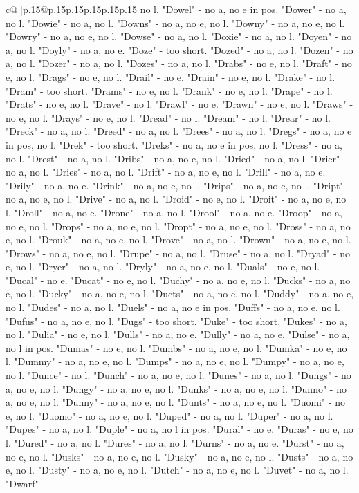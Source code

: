\documentclass{article}
\begin{document}
{\begin{supertabular}{c@{$\;$}|p{.15\linewidth}@{}p{.15\linewidth}p{.15\linewidth}p{.15\linewidth}p{.15\linewidth}p{.15\linewidth}}
{{{no l. "Dowel" {-} no a, no e in pos. "Dower" {-} no a, no l. "Dowie" {-} no a, no l. "Downs" {-} no a, no e, no l. "Downy" {-} no a, no e, no l. "Dowry" {-} no a, no e, no l. "Dowse" {-} no a, no l. "Doxie" {-} no a, no l. "Doyen" {-} no a, no l. "Doyly" {-} no a, no e. "Doze" {-} too short. "Dozed" {-} no a, no l. "Dozen" {-} no a, no l. "Dozer" {-} no a, no l. "Dozes" {-} no a, no l. "Drabs" {-} no e, no l. "Draft" {-} no e, no l. "Drags" {-} no e, no l. "Drail" {-} no e. "Drain" {-} no e, no l. "Drake" {-} no l. "Dram" {-} too short. "Drams" {-} no e, no l. "Drank" {-} no e, no l. "Drape" {-} no l. "Drats" {-} no e, no l. "Drave" {-} no l. "Drawl" {-} no e. "Drawn" {-} no e, no l. "Draws" {-} no e, no l. "Drays" {-} no e, no l. "Dread" {-} no l. "Dream" {-} no l. "Drear" {-} no l. "Dreck" {-} no a, no l. "Dreed" {-} no a, no l. "Drees" {-} no a, no l. "Dregs" {-} no a, no e in pos, no l. "Drek" {-} too short. "Dreks" {-} no a, no e in pos, no l. "Dress" {-} no a, no l. "Drest" {-} no a, no l. "Dribs" {-} no a, no e, no l. "Dried" {-} no a, no l. "Drier" {-} no a, no l. "Dries" {-} no a, no l. "Drift" {-} no a, no e, no l. "Drill" {-} no a, no e. "Drily" {-} no a, no e. "Drink" {-} no a, no e, no l. "Drips" {-} no a, no e, no l. "Dript" {-} no a, no e, no l. "Drive" {-} no a, no l. "Droid" {-} no e, no l. "Droit" {-} no a, no e, no l. "Droll" {-} no a, no e. "Drone" {-} no a, no l. "Drool" {-} no a, no e. "Droop" {-} no a, no e, no l. "Drops" {-} no a, no e, no l. "Dropt" {-} no a, no e, no l. "Dross" {-} no a, no e, no l. "Drouk" {-} no a, no e, no l. "Drove" {-} no a, no l. "Drown" {-} no a, no e, no l. "Drows" {-} no a, no e, no l. "Drupe" {-} no a, no l. "Druse" {-} no a, no l. "Dryad" {-} no e, no l. "Dryer" {-} no a, no l. "Dryly" {-} no a, no e, no l. "Duals" {-} no e, no l. "Ducal" {-} no e. "Ducat" {-} no e, no l. "Duchy" {-} no a, no e, no l. "Ducks" {-} no a, no e, no l. "Ducky" {-} no a, no e, no l. "Ducts" {-} no a, no e, no l. "Duddy" {-} no a, no e, no l. "Dudes" {-} no a, no l. "Duels" {-} no a, no e in pos. "Duffs" {-} no a, no e, no l. "Dufus" {-} no a, no e, no l. "Dugs" {-} too short. "Duke" {-} too short. "Dukes" {-} no a, no l. "Dulia" {-} no e, no l. "Dulls" {-} no a, no e. "Dully" {-} no a, no e. "Dulse" {-} no a, no l in pos. "Dumas" {-} no e, no l. "Dumbs" {-} no a, no e, no l. "Dumka" {-} no e, no l. "Dummy" {-} no a, no e, no l. "Dumps" {-} no a, no e, no l. "Dumpy" {-} no a, no e, no l. "Dunce" {-} no l. "Dunch" {-} no a, no e, no l. "Dunes" {-} no a, no l. "Dungs" {-} no a, no e, no l. "Dungy" {-} no a, no e, no l. "Dunks" {-} no a, no e, no l. "Dunno" {-} no a, no e, no l. "Dunny" {-} no a, no e, no l. "Dunts" {-} no a, no e, no l. "Duomi" {-} no e, no l. "Duomo" {-} no a, no e, no l. "Duped" {-} no a, no l. "Duper" {-} no a, no l. "Dupes" {-} no a, no l. "Duple" {-} no a, no l in pos. "Dural" {-} no e. "Duras" {-} no e, no l. "Dured" {-} no a, no l. "Dures" {-} no a, no l. "Durns" {-} no a, no e. "Durst" {-} no a, no e, no l. "Dusks" {-} no a, no e, no l. "Dusky" {-} no a, no e, no l. "Dusts" {-} no a, no e, no l. "Dusty" {-} no a, no e, no l. "Dutch" {-} no a, no e, no l. "Duvet" {-} no a, no l. "Dwarf" {-} }}}
\end{supertabular}}
\end{document}
